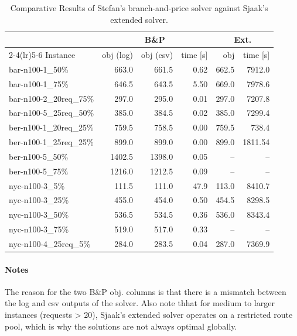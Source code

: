 \documentclass[preprint,11pt,authoryear]{elsarticle}
\begin{document}
\begin{table}[htbp]
\centering
\caption{Comparative Results of Stefan's branch-and-price solver against Sjaak's extended solver.}
\small
\setlength{\tabcolsep}{4pt}

\begin{tabular}{lrrrrr}
    \toprule
    & \multicolumn{3}{c}{B\&P} & \multicolumn{2}{c}{Ext.} \\
    \cmidrule(lr){2-4}\cmidrule(lr){5-6}
    Instance & obj (log) & obj (csv) & time [s] & obj & time [s] \\
    \midrule

    bar-n100-1\_50\% & 663.0 & 661.5 & 0.62 & 662.5 & 7912.0 \\
    bar-n100-1\_75\% & 646.5 & 643.5 & 5.50 & 669.0 & 7978.6 \\
    bar-n100-2\_20req\_75\% & 297.0 & 295.0 & 0.01 & 297.0 & 7207.8 \\
    bar-n100-5\_25req\_50\% & 385.0 & 384.5 & 0.02 & 385.0 & 7299.4 \\
    ber-n100-1\_20req\_25\% & 759.5 & 758.5 & 0.00 & 759.5 & 738.4 \\
    ber-n100-1\_25req\_25\% & 899.0 & 899.0 & 0.00 & 899.0 & 1811.54 \\
    ber-n100-5\_50\% & 1402.5 & 1398.0 & 0.05 & -- & -- \\
    ber-n100-5\_75\% & 1216.0 & 1212.5 & 0.09 & -- & -- \\
    nyc-n100-3\_5\% & 111.5 & 111.0 & 47.9 & 113.0 & 8410.7 \\
    nyc-n100-3\_25\% & 455.0 & 454.0 & 0.50 & 454.5 & 8298.5 \\
    nyc-n100-3\_50\% & 536.5 & 534.5 & 0.36 & 536.0 & 8343.4 \\
    nyc-n100-3\_75\% & 519.0 & 517.0 & 0.33 & -- & -- \\
    nyc-n100-4\_25req\_5\% & 284.0 & 283.5 & 0.04 & 287.0 & 7369.9 \\
    \bottomrule
\end{tabular}

\end{table}

\paragraph{Notes} 
The reason for the two B\&P obj. columns is that there is a mismatch between the log and csv outputs of the solver. 
Also note thhat for medium to larger instances (requests > 20), Sjaak's extended solver operates on a restricted route pool, which is why the solutions are not always optimal globally.
\end{document}
